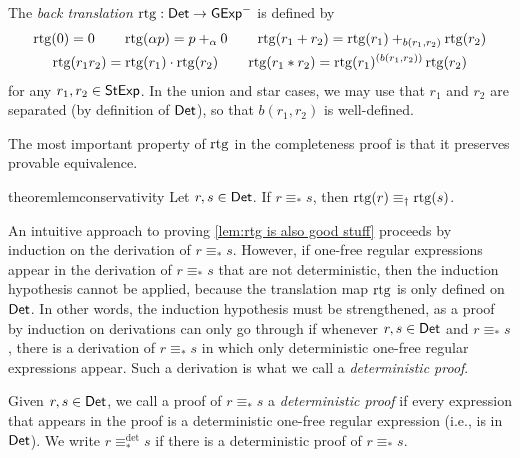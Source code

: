 \documentclass[orivec,envcountsect,envcountsame]{llncs}
\begin{document}
\begin{definition}\label{def:rtg}
    The \emph{back translation} \(\operatorname{rtg} : \mathsf{Det} \to \mathsf{GExp}^-\) is defined by
    \begin{gather*}
        \operatorname{rtg}(0) = 0
        \qquad
        \operatorname{rtg}(\alpha p) = p+_\alpha 0
        \qquad
        \operatorname{rtg}(r_1 + r_2) = \operatorname{rtg}(r_1) +_{b(r_1, r_2)} \operatorname{rtg}(r_2)
        \\
        \operatorname{rtg}(r_1r_2) = \operatorname{rtg}(r_1)\cdot \operatorname{rtg}(r_2)
        \qquad
        \operatorname{rtg}(r_1*r_2) = \operatorname{rtg}( r_1)^{(b(r_1, r_2))}\operatorname{rtg}(r_2)
    \end{gather*}
    for any \(r_1,r_2 \in \mathsf{StExp}\).
    In the union and star cases, we may use that \(r_1\) and \(r_2\) are separated (by definition of $\mathsf{Det}$), so that \(b(r_1, r_2)\) is well-defined.
\end{definition}

The most important property of \(\operatorname{rtg}\) in the completeness proof is that it preserves provable equivalence.


\begin{restatable}{theorem}{lemconservativity}\label{lem:rtg is also good stuff}
    Let \(r, s \in \mathsf{Det}\).
    If \(r \equiv_* s\), then \(\operatorname{rtg}(r) \equiv_\dagger \operatorname{rtg}(s)\).
\end{restatable}

An intuitive approach to proving \cref{lem:rtg is also good stuff} proceeds by induction on the derivation of \(r \equiv_* s\).
However, if one-free regular expressions appear in the derivation of \(r \equiv_* s\) that are not deterministic, then the induction hypothesis cannot be applied, because the translation map \(\operatorname{rtg}\) is only defined on \(\mathsf{Det}\).
In other words, the  induction hypothesis must be strengthened, as a proof by induction on derivations can only go through if whenever \(r, s \in \mathsf{Det}\) and \(r \equiv_* s\), there is a derivation of \(r \equiv_* s\) in which only deterministic one-free regular expressions appear.
Such a derivation is what we call a \emph{deterministic proof}.

\begin{definition}
    Given \(r,s \in \mathsf{Det}\), we call a proof of \(r \equiv_* s\) a \emph{deterministic proof} if every expression that appears in the proof is a deterministic one-free regular expression (i.e., is in \(\mathsf{Det}\)).
    We write \(r \equiv_*^{\det} s\) if there is a deterministic proof of \(r \equiv_* s\).
\end{definition}
\end{document}
